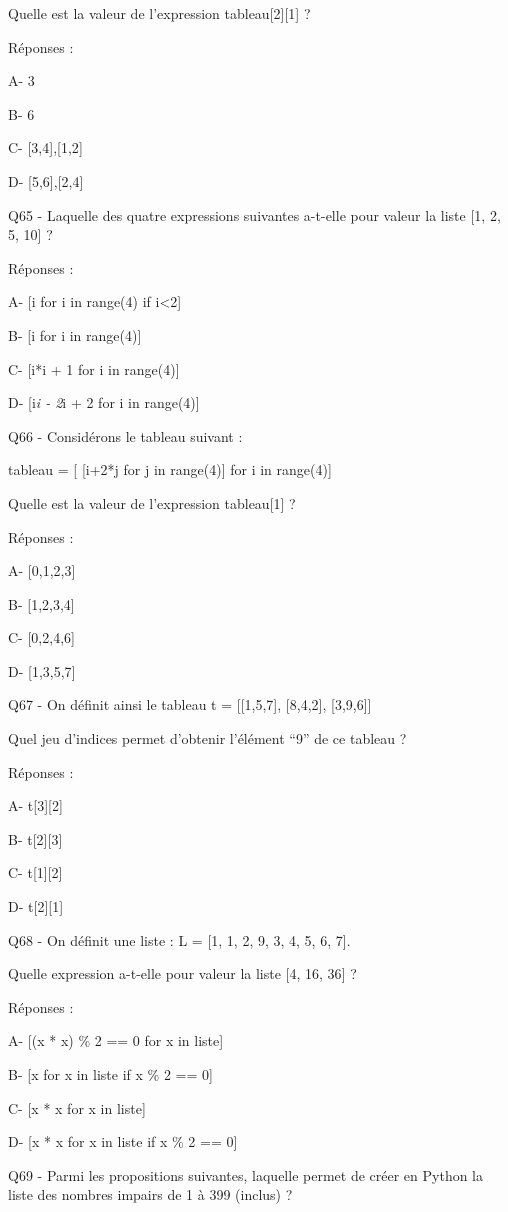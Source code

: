 \documentclass[
]{book}
\begin{document}
Quelle est la valeur de l'expression tableau{[}2{]}{[}1{]} ?

Réponses :

A- 3

B- 6

C- {[}3,4{]},{[}1,2{]}

D- {[}5,6{]},{[}2,4{]}

Q65 - Laquelle des quatre expressions suivantes a-t-elle pour valeur la liste {[}1, 2, 5, 10{]} ?

Réponses :

A- {[}i for i in range(4) if i\textless2{]}

B- {[}i for i in range(4){]}

C- {[}i*i + 1 for i in range(4){]}

D- {[}i\emph{i - 2}i + 2 for i in range(4){]}

Q66 - Considérons le tableau suivant :

tableau = {[} {[}i+2*j for j in range(4){]} for i in range(4){]}

Quelle est la valeur de l'expression tableau{[}1{]} ?

Réponses :

A- {[}0,1,2,3{]}

B- {[}1,2,3,4{]}

C- {[}0,2,4,6{]}

D- {[}1,3,5,7{]}

Q67 - On définit ainsi le tableau t = {[}{[}1,5,7{]}, {[}8,4,2{]}, {[}3,9,6{]}{]}

Quel jeu d'indices permet d'obtenir l'élément ``9'' de ce tableau ?

Réponses :

A- t{[}3{]}{[}2{]}

B- t{[}2{]}{[}3{]}

C- t{[}1{]}{[}2{]}

D- t{[}2{]}{[}1{]}

Q68 - On définit une liste : L = {[}1, 1, 2, 9, 3, 4, 5, 6, 7{]}.

Quelle expression a-t-elle pour valeur la liste {[}4, 16, 36{]} ?

Réponses :

A- {[}(x * x) \% 2 == 0 for x in liste{]}

B- {[}x for x in liste if x \% 2 == 0{]}

C- {[}x * x for x in liste{]}

D- {[}x * x for x in liste if x \% 2 == 0{]}

Q69 - Parmi les propositions suivantes, laquelle permet de créer en Python la liste des nombres impairs de 1 à 399 (inclus) ?
\end{document}

